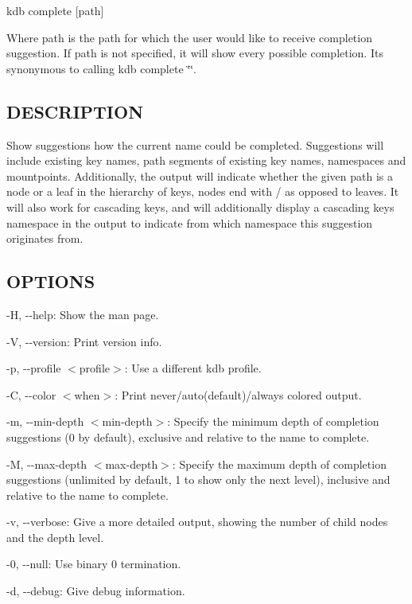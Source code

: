 {\ttfamily kdb complete \mbox{[}path\mbox{]}}

Where {\ttfamily path} is the path for which the user would like to receive completion suggestion. If {\ttfamily path} is not specified, it will show every possible completion. Its synonymous to calling {\ttfamily kdb complete \char`\"{}\char`\"{}}.

\subsection*{D\+E\+S\+C\+R\+I\+P\+T\+I\+ON}

Show suggestions how the current name could be completed. Suggestions will include existing key names, path segments of existing key names, namespaces and mountpoints. Additionally, the output will indicate whether the given path is a node or a leaf in the hierarchy of keys, nodes end with \textquotesingle{}/\textquotesingle{} as opposed to leaves. It will also work for cascading keys, and will additionally display a cascading key\textquotesingle{}s namespace in the output to indicate from which namespace this suggestion originates from.

\subsection*{O\+P\+T\+I\+O\+NS}


\begin{DoxyItemize}
\item {\ttfamily -\/H}, {\ttfamily -\/-\/help}\+: Show the man page.
\item {\ttfamily -\/V}, {\ttfamily -\/-\/version}\+: Print version info.
\item {\ttfamily -\/p}, {\ttfamily -\/-\/profile $<$profile$>$}\+: Use a different kdb profile.
\item {\ttfamily -\/C}, {\ttfamily -\/-\/color $<$when$>$}\+: Print never/auto(default)/always colored output.
\item {\ttfamily -\/m}, {\ttfamily -\/-\/min-\/depth $<$min-\/depth$>$}\+: Specify the minimum depth of completion suggestions (0 by default), exclusive and relative to the name to complete.
\item {\ttfamily -\/M}, {\ttfamily -\/-\/max-\/depth $<$max-\/depth$>$}\+: Specify the maximum depth of completion suggestions (unlimited by default, 1 to show only the next level), inclusive and relative to the name to complete.
\item {\ttfamily -\/v}, {\ttfamily -\/-\/verbose}\+: Give a more detailed output, showing the number of child nodes and the depth level.
\item {\ttfamily -\/0}, {\ttfamily -\/-\/null}\+: Use binary 0 termination.
\item {\ttfamily -\/d}, {\ttfamily -\/-\/debug}\+: Give debug information.
\end{DoxyItemize}

